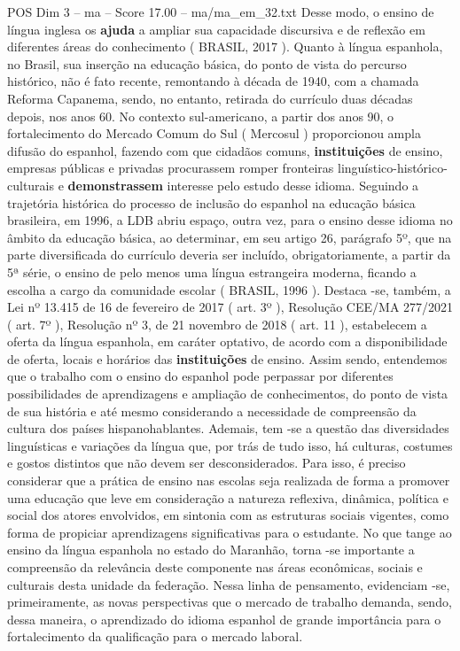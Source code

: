 \begin{textsample}{POS Dim 3 – ma – Score 17.00 – ma/ma\_em\_32.txt}
Desse modo, o ensino de língua inglesa os \textbf{ajuda} a ampliar sua capacidade discursiva e de reflexão em diferentes áreas do conhecimento ( BRASIL, 2017 ).
Quanto à língua espanhola, no Brasil, sua inserção na educação básica, do ponto de vista do percurso histórico, não é fato recente, remontando à década de 1940, com a chamada Reforma Capanema, sendo, no entanto, retirada do currículo duas décadas depois, nos anos 60.
No contexto sul-americano, a partir dos anos 90, o fortalecimento do Mercado Comum do Sul ( Mercosul ) proporcionou ampla difusão do espanhol, fazendo com que cidadãos comuns, \textbf{instituições} de ensino, empresas públicas e privadas procurassem romper fronteiras linguístico-histórico-culturais e \textbf{demonstrassem} interesse pelo estudo desse idioma.
Seguindo a trajetória histórica do processo de inclusão do espanhol na educação básica brasileira, em 1996, a LDB abriu espaço, outra vez, para o ensino desse idioma no âmbito da educação básica, ao determinar, em seu artigo 26, parágrafo 5º, que na parte diversificada do currículo deveria ser incluído, obrigatoriamente, a partir da 5ª série, o ensino de pelo menos uma língua estrangeira moderna, ficando a escolha a cargo da comunidade escolar ( BRASIL, 1996 ).
Destaca -se, também, a Lei nº 13.415 de 16 de fevereiro de 2017 ( art. 3º ), Resolução CEE/MA 277/2021 ( art. 7º ), Resolução nº 3, de 21 novembro de 2018 ( art. 11 ), estabelecem a oferta da língua espanhola, em caráter optativo, de acordo com a disponibilidade de oferta, locais e horários das \textbf{instituições} de ensino.
Assim sendo, entendemos que o trabalho com o ensino do espanhol pode perpassar por diferentes possibilidades de aprendizagens e ampliação de conhecimentos, do ponto de vista de sua história e até mesmo considerando a necessidade de compreensão da cultura dos países hispanohablantes.
Ademais, tem -se a questão das diversidades linguísticas e variações da língua que, por trás de tudo isso, há culturas, costumes e gostos distintos que não devem ser desconsiderados.
Para isso, é preciso considerar que a prática de ensino nas escolas seja realizada de forma a promover uma educação que leve em consideração a natureza reflexiva, dinâmica, política e social dos atores envolvidos, em sintonia com as estruturas sociais vigentes, como forma de propiciar aprendizagens significativas para o estudante.
No que tange ao ensino da língua espanhola no estado do Maranhão, torna -se importante a compreensão da relevância deste componente nas áreas econômicas, sociais e culturais desta unidade da federação.
Nessa linha de pensamento, evidenciam -se, primeiramente, as novas perspectivas que o mercado de trabalho demanda, sendo, dessa maneira, o aprendizado do idioma espanhol de grande importância para o fortalecimento da qualificação para o mercado laboral.

\end{textsample}
